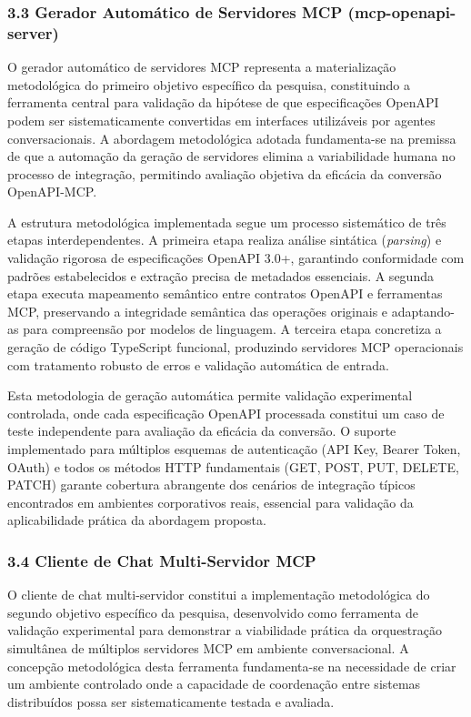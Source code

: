 \documentclass[
]{article}
\begin{document}
\subsubsection{3.3 Gerador Automático de Servidores MCP
(mcp-openapi-server)}\label{gerador-automuxe1tico-de-servidores-mcp-mcp-openapi-server}

O gerador automático de servidores MCP representa a materialização
metodológica do primeiro objetivo específico da pesquisa, constituindo a
ferramenta central para validação da hipótese de que especificações
OpenAPI podem ser sistematicamente convertidas em interfaces utilizáveis
por agentes conversacionais. A abordagem metodológica adotada
fundamenta-se na premissa de que a automação da geração de servidores
elimina a variabilidade humana no processo de integração, permitindo
avaliação objetiva da eficácia da conversão OpenAPI-MCP.

A estrutura metodológica implementada segue um processo sistemático de
três etapas interdependentes. A primeira etapa realiza análise sintática
(\emph{parsing}) e validação rigorosa de especificações OpenAPI 3.0+,
garantindo conformidade com padrões estabelecidos e extração precisa de
metadados essenciais. A segunda etapa executa mapeamento semântico entre
contratos OpenAPI e ferramentas MCP, preservando a integridade semântica
das operações originais e adaptando-as para compreensão por modelos de
linguagem. A terceira etapa concretiza a geração de código TypeScript
funcional, produzindo servidores MCP operacionais com tratamento robusto
de erros e validação automática de entrada.

Esta metodologia de geração automática permite validação experimental
controlada, onde cada especificação OpenAPI processada constitui um caso
de teste independente para avaliação da eficácia da conversão. O suporte
implementado para múltiplos esquemas de autenticação (API Key, Bearer
Token, OAuth) e todos os métodos HTTP fundamentais (GET, POST, PUT,
DELETE, PATCH) garante cobertura abrangente dos cenários de integração
típicos encontrados em ambientes corporativos reais, essencial para
validação da aplicabilidade prática da abordagem proposta.

\subsubsection{3.4 Cliente de Chat Multi-Servidor
MCP}\label{cliente-de-chat-multi-servidor-mcp}

O cliente de chat multi-servidor constitui a implementação metodológica
do segundo objetivo específico da pesquisa, desenvolvido como ferramenta
de validação experimental para demonstrar a viabilidade prática da
orquestração simultânea de múltiplos servidores MCP em ambiente
conversacional. A concepção metodológica desta ferramenta fundamenta-se
na necessidade de criar um ambiente controlado onde a capacidade de
coordenação entre sistemas distribuídos possa ser sistematicamente
testada e avaliada.
\end{document}
